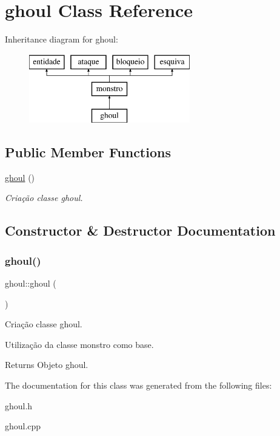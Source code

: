 \hypertarget{classghoul}{}\section{ghoul Class Reference}
\label{classghoul}
Inheritance diagram for ghoul\+:\begin{figure}[H]
\begin{center}
\leavevmode
\includegraphics[height=3.000000cm]{classghoul}
\end{center}
\end{figure}
\subsection*{Public Member Functions}
\begin{DoxyCompactItemize}
\item 
\mbox{\hyperlink{classghoul_a35e44ea504998a44381e654defdd1202}{ghoul}} ()
\begin{DoxyCompactList}\small\item\em Criação classe ghoul. \end{DoxyCompactList}\end{DoxyCompactItemize}


\subsection{Constructor \& Destructor Documentation}
\mbox{\label{classghoul_a35e44ea504998a44381e654defdd1202}} 
\subsubsection{\texorpdfstring{ghoul()}{ghoul()}}
{\footnotesize\ttfamily ghoul\+::ghoul (\begin{DoxyParamCaption}{ }\end{DoxyParamCaption})}



Criação classe ghoul. 

Utilização da classe monstro como base. \begin{DoxyReturn}{Returns}
Objeto ghoul. 
\end{DoxyReturn}


The documentation for this class was generated from the following files\+:\begin{DoxyCompactItemize}
\item 
ghoul.\+h\item 
ghoul.\+cpp\end{DoxyCompactItemize}

